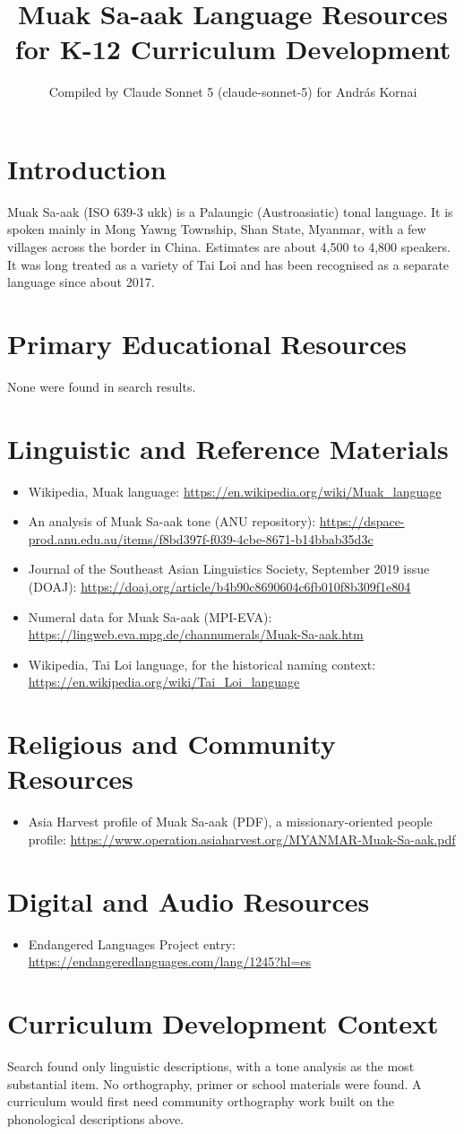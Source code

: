 \documentclass[12pt]{article}
\title{Muak Sa-aak Language Resources for K-12 Curriculum Development}
\author{Compiled by Claude Sonnet 5 (claude-sonnet-5) for Andr\'as Kornai}
\date{}
\begin{document}
\maketitle
\section{Introduction}
Muak Sa-aak (ISO 639-3 ukk) is a Palaungic (Austroasiatic) tonal language. It is spoken mainly in Mong Yawng Township, Shan State, Myanmar, with a few villages across the border in China. Estimates are about 4,500 to 4,800 speakers. It was long treated as a variety of Tai Loi and has been recognised as a separate language since about 2017.
\section{Primary Educational Resources}
None were found in search results.
\section{Linguistic and Reference Materials}
\begin{itemize}
\item Wikipedia, Muak language: \url{https://en.wikipedia.org/wiki/Muak_language}
\item An analysis of Muak Sa-aak tone (ANU repository): \url{https://dspace-prod.anu.edu.au/items/f8bd397f-f039-4cbe-8671-b14bbab35d3c}
\item Journal of the Southeast Asian Linguistics Society, September 2019 issue (DOAJ): \url{https://doaj.org/article/b4b90c8690604c6fb010f8b309f1e804}
\item Numeral data for Muak Sa-aak (MPI-EVA): \url{https://lingweb.eva.mpg.de/channumerals/Muak-Sa-aak.htm}
\item Wikipedia, Tai Loi language, for the historical naming context: \url{https://en.wikipedia.org/wiki/Tai_Loi_language}
\end{itemize}
\section{Religious and Community Resources}
\begin{itemize}
\item Asia Harvest profile of Muak Sa-aak (PDF), a missionary-oriented people profile: \url{https://www.operation.asiaharvest.org/MYANMAR-Muak-Sa-aak.pdf}
\end{itemize}
\section{Digital and Audio Resources}
\begin{itemize}
\item Endangered Languages Project entry: \url{https://endangeredlanguages.com/lang/1245?hl=es}
\end{itemize}
\section{Curriculum Development Context}
Search found only linguistic descriptions, with a tone analysis as the most substantial item. No orthography, primer or school materials were found. A curriculum would first need community orthography work built on the phonological descriptions above.
\end{document}
